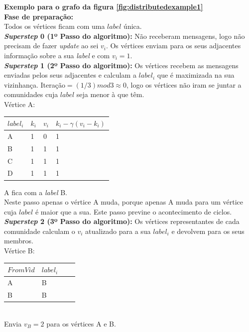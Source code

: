 \documentclass[a4paper,10pt]{report}
\begin{document}
{\bf Exemplo para o grafo da figura \ref{fig:distributedexample1}}
\\[0.25cm]
{\bf Fase de preparação:}\\
Todos os vértices ficam com uma $label$ única. 
\\[0.25cm]
{\bf \textit{Superstep} 0  (1º Passo do algoritmo):}
Não receberam mensagens, logo não precisam de fazer \textit{update} ao sei 
$v_i$.
Os vértices enviam para os seus adjacentes 
informação sobre a sua \textit{label} e com $v_i=1$.
\\[0.25cm]
{\bf \textit{Superstep} 1 (2º Passo do algoritmo):}
Os vértices recebem as mensagens enviadas pelos seus adjacentes e calculam a 
$label_i$ que é maximizada na sua vizinhança. Iteração$ = (1/3) mod 3\approx0$, 
logo os vértices não iram se juntar a comunidades cuja $label$ seja menor à que 
têm.
\\[0.25cm]
Vértice A:
  \begin{tabular}{| l | l | l | l |}
  \hline
  $label_i$ & $k_i$ & $v_i$ & $k_i - \gamma(v_i - k_i)$\\ \hline
  A & 1 & 0 & 1 \\ \hline
  B & 1 & 1 & 1  \\ \hline
  C & 1 & 1 & 1  \\ \hline
  D & 1 & 1 & 1  \\ \hline
  \end{tabular}
  A fica com a \textit{label} B.
\\[0.25cm]
Neste passo apenas o vértice A muda, porque apenas A muda para um vértice cuja 
$label$ é maior que a sua. Este passo previne o acontecimento de ciclos.
\\[0.25cm]
{\bf \textit{Superstep} 2 (3º Passo do algoritmo):} Os vértices representantes 
de cada comunidade calculam o $v_i$ atualizado para a sua $label_i$ e devolvem 
para os seus membros.
\\[0.25cm]
Vértice B:
  \begin{tabular}{| l | l | l | l |}
  \hline
  $From Vid$ & $label_i$\\ \hline
  A & B \\ \hline
  B & B \\ \hline
  \end{tabular}  
\\[0.25cm]
  Envia $v_B = 2$ para os vértices A e B.
  
\end{document}
